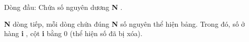 Dòng đầu: Chứa số nguyên dương   \textbf{    N   }   .  

\textbf{    N   }   dòng tiếp, mỗi dòng chứa đúng   \textbf{    N   }   số nguyên thể hiện bảng. Trong đó, số ở hàng   \textbf{    i   }   , cột   \textbf{    i   }   bằng 0 (thể hiện số đã bị xóa).